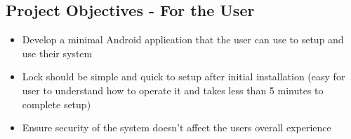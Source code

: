 \subsection{Project Objectives - For the User}
\begin{itemize}
	\item Develop a minimal Android application that the user can use to setup and use their system
	\item Lock should be simple and quick to setup after initial installation (easy for user to understand how to operate it and takes less than 5 minutes to complete setup)
	\item Ensure security of the system doesn't affect the users overall experience
\end{itemize}